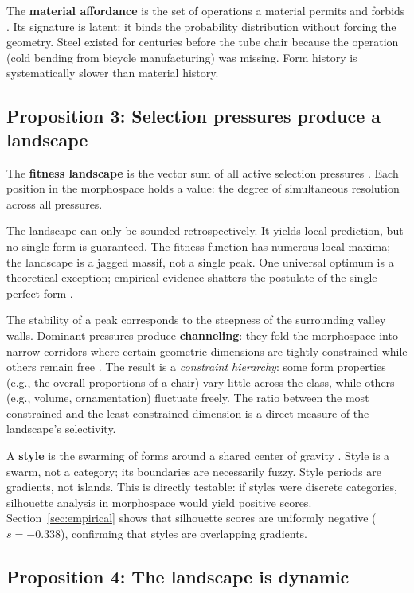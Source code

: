 The \textbf{material affordance} is the set of operations a material permits and forbids \parencite{Gibson1979}. Its signature is latent: it binds the probability distribution without forcing the geometry. Steel existed for centuries before the tube chair because the operation (cold bending from bicycle manufacturing) was missing. Form history is systematically slower than material history.

\subsection{Proposition 3: Selection pressures produce a landscape}
\label{sec:prop3}

The \textbf{fitness landscape} is the vector sum of all active selection pressures \parencite{Wright1932, Waddington1957}. Each position in the morphospace holds a value: the degree of simultaneous resolution across all pressures.

The landscape can only be sounded retrospectively. It yields local prediction, but no single form is guaranteed. The fitness function has numerous local maxima; the landscape is a jagged massif, not a single peak. One universal optimum is a theoretical exception; empirical evidence shatters the postulate of the single perfect form \parencite{Kauffman1993}.

The stability of a peak corresponds to the steepness of the surrounding valley walls. Dominant pressures produce \textbf{channeling}: they fold the morphospace into narrow corridors where certain geometric dimensions are tightly constrained while others remain free \parencite{Waddington1957}. The result is a \textit{constraint hierarchy}: some form properties (e.g., the overall proportions of a chair) vary little across the class, while others (e.g., volume, ornamentation) fluctuate freely. The ratio between the most constrained and the least constrained dimension is a direct measure of the landscape's selectivity.

A \textbf{style} is the swarming of forms around a shared center of gravity \parencite{Kubler1962}. Style is a swarm, not a category; its boundaries are necessarily fuzzy. Style periods are gradients, not islands. This is directly testable: if styles were discrete categories, silhouette analysis in morphospace would yield positive scores. Section~\ref{sec:empirical} shows that silhouette scores are uniformly negative ($s = -0.338$), confirming that styles are overlapping gradients.

\subsection{Proposition 4: The landscape is dynamic}
\label{sec:prop4}

